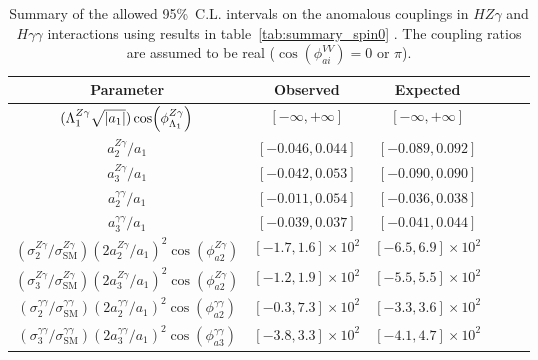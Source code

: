 \begin{table}
\centering
\caption[Summary of the allowed 95\%~C.L. intervals on the anomalous couplings in $HZ\gamma$ and $H\gamma\gamma$ interactions
using results in table~\ref{tab:summary_spin0}.
The coupling ratios are assumed to be real ($\cos(\phi^{VV}_{ai})=0$ or $\pi$).]{
Summary of the allowed 95\%~C.L. intervals on the anomalous couplings in $HZ\gamma$ and $H\gamma\gamma$ interactions
using results in table~\ref{tab:summary_spin0} \cite{Khachatryan:2014kca}.
The coupling ratios are assumed to be real ($\cos(\phi^{VV}_{ai})=0$ or $\pi$).
\label{tab:Spin0zg_interpretation}
}
\begin{tabular}{cccccc}
Parameter & Observed & Expected    \\
\hline

$(\Lambda_{1}^{Z\gamma}\sqrt{\abs{a_1}}) \cos(\phi^{Z\gamma}_{\Lambda_{1}})$ &   $[-\infty,+\infty]$ & $[-\infty,+\infty]$   \\

$ a^{Z\gamma}_2/a_{1} $ &   $[-0.046,0.044]$ & $[-0.089,0.092]$                                               \\

$ a^{Z\gamma}_{3}/a_{1} $ &   $[-0.042,0.053]$ & $[-0.090,0.090]$                                               \\

$ a^{\gamma\gamma}_2/a_{1} $ &   $[-0.011,0.054]$ & $[-0.036,0.038]$                                               \\

$ a^{\gamma\gamma}_{3}/a_{1} $ &   $[-0.039,0.037]$ & $[-0.041,0.044]$                                               \\

\hline

$ (\sigma^{Z\gamma}_2/\sigma^{Z\gamma}_\mathrm{SM})(2a_2^{Z\gamma}/{a_1})^2\cos(\phi_{a2}^{Z\gamma}) $ &   $[-1.7,1.6]\times10^2$ & $[-6.5,6.9]\times10^2$          \\

$ (\sigma^{Z\gamma}_{3}/\sigma^{Z\gamma}_\mathrm{SM})(2a_3^{Z\gamma}/{a_1})^2\cos(\phi_{a2}^{Z\gamma})  $ &   $[-1.2, 1.9]\times10^2$ & $[-5.5, 5.5]\times10^2$                                               \\

$ (\sigma^{\gamma\gamma}_2/\sigma^{\gamma\gamma}_\mathrm{SM})(2a_2^{\gamma\gamma}/{a_1})^2\cos(\phi_{a2}^{\gamma\gamma}) $ &   $[-0.3, 7.3]\times10^2$ & $[-3.3,3.6]\times10^2$     \\
$ (\sigma^{\gamma\gamma}_{3}/\sigma^{\gamma\gamma}_\mathrm{SM})(2a_3^{\gamma\gamma}/{a_1})^2\cos(\phi_{a3}^{\gamma\gamma}) $ &   $[-3.8,3.3]\times10^2$ & $[-4.1,4.7]\times10^2$                                               \\
\end{tabular}
\end{table}

